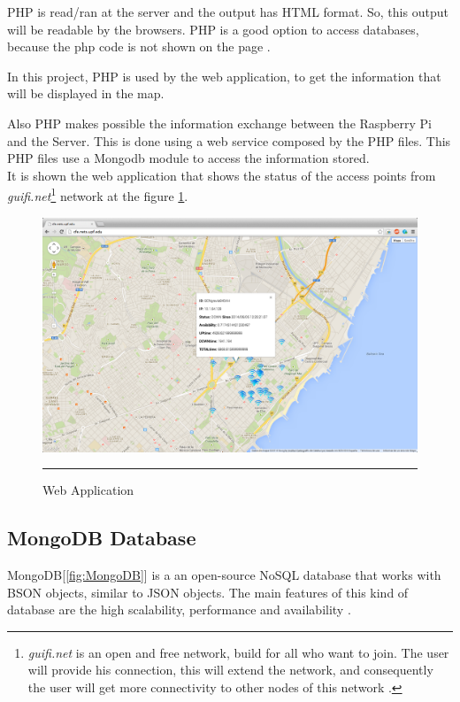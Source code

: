 \documentclass[12pt, a4paper,twoside]{tesi_upf}
\begin{document}
                PHP is read/ran at the server and the output has HTML format. So, this output will be readable by the browsers. PHP is a good option to access databases, because the php code is not shown on the page \cite{php}.
                
                In this project, PHP is used by the web application, to get the information that will be displayed in the map.
                 
                Also PHP makes possible the information exchange between the Raspberry Pi and the Server. This is done using a web service composed by the PHP files. This PHP files use a Mongodb module to access the information stored.\\


It is shown the web application that shows the status of the access points from \textit{guifi.net}\footnote{\textit{guifi.net} is an open and free network, build for all who want to join. The user will provide his connection, this will extend the network, and consequently the user will get more connectivity to other nodes of this network \cite{guifinet}.} network at the figure \ref{fig:wapp}.

        \begin{figure}[htbp]
          \centering
              \includegraphics[scale=0.3]{./figures/WebApplication.png}
              \rule{32em}{0.5pt}
          \caption[Web Application]{Web Application}
          \label{fig:wapp}
        \end{figure}
        
        
        \subsection{MongoDB Database}
        \label{mongosection}
        MongoDB[\ref{fig:MongoDB}] is a an open-source NoSQL database that works with BSON objects, similar to JSON objects. The main features of this kind of database are the high scalability, performance and availability \cite{mongo}.
        
\end{document}
